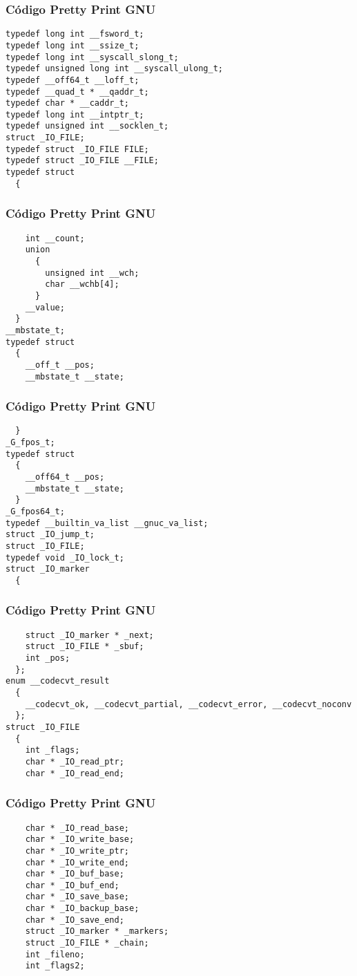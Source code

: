 \documentclass{beamer}
\begin{document}
\begin{frame}[fragile]
\frametitle{C\'odigo Pretty Print GNU}
\begin{verbatim}
typedef long int __fsword_t;
typedef long int __ssize_t;
typedef long int __syscall_slong_t;
typedef unsigned long int __syscall_ulong_t;
typedef __off64_t __loff_t;
typedef __quad_t * __qaddr_t;
typedef char * __caddr_t;
typedef long int __intptr_t;
typedef unsigned int __socklen_t;
struct _IO_FILE;
typedef struct _IO_FILE FILE;
typedef struct _IO_FILE __FILE;
typedef struct
  {
    \end{verbatim}
\end{frame}
\begin{frame}[fragile]
\frametitle{C\'odigo Pretty Print GNU}
\begin{verbatim}
    int __count;
    union
      {
        unsigned int __wch;
        char __wchb[4];
      }
    __value;
  }
__mbstate_t;
typedef struct
  {
    __off_t __pos;
    __mbstate_t __state;
\end{verbatim}
\end{frame}
\begin{frame}[fragile]
\frametitle{C\'odigo Pretty Print GNU}
\begin{verbatim}
  }
_G_fpos_t;
typedef struct
  {
    __off64_t __pos;
    __mbstate_t __state;
  }
_G_fpos64_t;
typedef __builtin_va_list __gnuc_va_list;
struct _IO_jump_t;
struct _IO_FILE;
typedef void _IO_lock_t;
struct _IO_marker
  {
    \end{verbatim}
\end{frame}
\begin{frame}[fragile]
\frametitle{C\'odigo Pretty Print GNU}
\begin{verbatim}
    struct _IO_marker * _next;
    struct _IO_FILE * _sbuf;
    int _pos;
  };
enum __codecvt_result
  {
    __codecvt_ok, __codecvt_partial, __codecvt_error, __codecvt_noconv
  };
struct _IO_FILE
  {
    int _flags;
    char * _IO_read_ptr;
    char * _IO_read_end;
\end{verbatim}
\end{frame}
\begin{frame}[fragile]
\frametitle{C\'odigo Pretty Print GNU}
\begin{verbatim}
    char * _IO_read_base;
    char * _IO_write_base;
    char * _IO_write_ptr;
    char * _IO_write_end;
    char * _IO_buf_base;
    char * _IO_buf_end;
    char * _IO_save_base;
    char * _IO_backup_base;
    char * _IO_save_end;
    struct _IO_marker * _markers;
    struct _IO_FILE * _chain;
    int _fileno;
    int _flags2;
\end{verbatim}
\end{frame}
\end{document}
